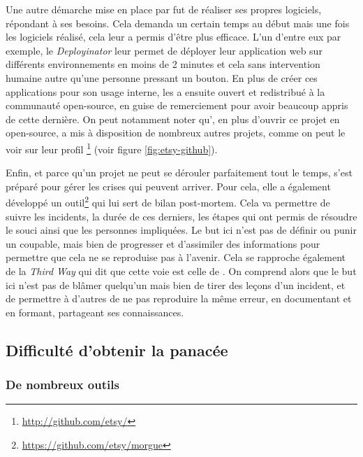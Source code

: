 Une autre démarche mise en place par \etsy{} fut de réaliser ses propres logiciels, répondant à ses besoins. Cela demanda un certain temps au début mais une fois les logiciels réalisé, cela leur a permis d'être plus efficace. L'un d'entre eux par exemple, le \emph{Deployinator} leur permet de déployer leur application web sur différents environnements en moins de 2 minutes et cela sans intervention humaine autre qu'une personne pressant un bouton. En plus de créer ces applications pour son usage interne, \etsy{} les a ensuite ouvert et redistribué à la communauté open-source, en guise de remerciement pour avoir beaucoup appris de cette dernière. On peut notamment noter qu'\etsy, en plus d'ouvrir ce projet en open-source, a mis à disposition de nombreux autres projets, comme on peut le voir sur leur profil \github\footnote{ \url{http://github.com/etsy/}} (voir figure \ref{fig:etsy-github}).


Enfin, et parce qu'un projet ne peut se dérouler parfaitement tout le temps, \etsy{} s'est préparé pour gérer les crises qui peuvent arriver. Pour cela, elle a également développé un outil\footnote{\url{https://github.com/etsy/morgue}} qui lui sert de bilan post-mortem. Cela va permettre de suivre les incidents, la durée de ces derniers, les étapes qui ont permis de résoudre le souci ainsi que les personnes impliquées. Le but ici n'est pas de définir ou punir un coupable, mais bien de progresser et d'assimiler des informations pour permettre que cela ne se reproduise pas à l'avenir. Cela se rapproche également de la \emph{Third Way} qui dit que cette voie est celle de . On comprend alors que le but ici n'est pas de blâmer quelqu'un mais bien de tirer des leçons d'un incident, et de permettre à d'autres de ne pas reproduire la même erreur, en documentant et en formant, partageant ses connaissances.

\subsection{Difficulté d'obtenir la panacée}

\subsubsection{De nombreux outils}

